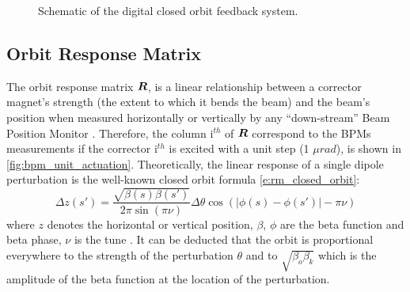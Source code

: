 \begin{figure}	
    \centering 
    \caption{Schematic of the digital closed orbit feedback system.}
    \label{f:sytem_simple}
\end{figure}

\subsection{Orbit Response Matrix}

The orbit response matrix $\bm{R}$, is a linear relationship between a corrector magnet's strength (the extent to which it bends the beam) and the beam's position when measured horizontally or vertically by any “down-stream” Beam Position Monitor \cite{white1997hybrid}. Therefore, the column $\textrm{i}^{th}$ of $\bm{R}$ correspond to the BPMs measurements if the corrector $\textrm{i}^{th}$ is excited with a unit step (1 $\mu rad$), is shown in \ref{fig:bpm_unit_actuation}. Theoretically, the linear response of a single dipole perturbation is the well-known closed orbit formula \ref{e:rm_closed_orbit}:
\begin{equation} \label{e:rm_closed_orbit}
    \Delta z(s') = \frac{\sqrt{\beta(s) \beta(s')}}{2 \pi \sin(\pi \nu)} \Delta \theta \cos(|\phi(s) - \phi(s')| - \pi \nu)
\end{equation}
where $z$ denotes the horizontal or vertical position, $\beta$, $\phi$ are the beta function and beta phase, $\nu$ is the tune \cite{chiu2008conceptual}. It can be deducted that the orbit is proportional everywhere to the strength of the perturbation $\theta$ and to $\sqrt{\beta_o \beta_k}$ which is the amplitude of the beta function at the location of the perturbation.


